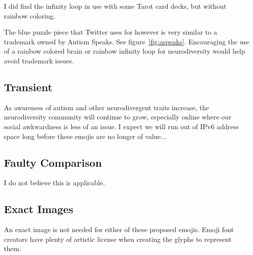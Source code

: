 I did find the infinity loop in use with some Tarot card decks, but without rainbow coloring.

The blue puzzle piece that Twitter uses for \jigsawemoji{} however is very
similar to a trademark owned by Autism Speaks. See figure~\ref{fig:aspeaks}. Encouraging the
use of a rainbow colored brain or rainbow infinity loop for neurodiversity would help avoid
trademark issues.

\subsection{Transient}

As awareness of autism and other neurodivergent traits increase, the neurodiversity community
will continue to grow, especially online where our social awkwardness is less of an issue. I
expect we will run out of IPv6 address space long before these emojis are no longer of value...

\subsection{Faulty Comparison}

I do not believe this is applicable.

\subsection{Exact Images}

An exact image is not needed for either of these proposed emojis. Emoji font creators have plenty
of artistic license when creating the glyphs to represent them.
